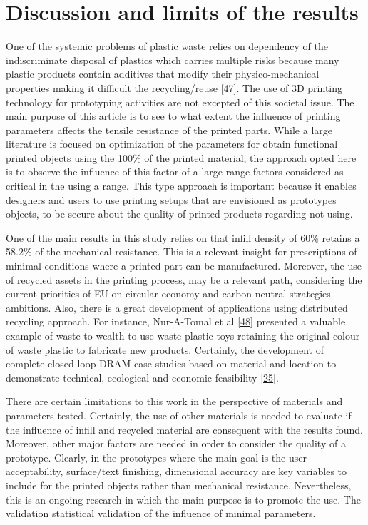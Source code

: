 \documentclass[conference,final,]{IEEEtran}
\begin{document}
\hypertarget{discussion-and-limits-of-the-results}{%
\section{Discussion and limits of the
results}\label{discussion-and-limits-of-the-results}}

One of the systemic problems of plastic waste relies on dependency of
the indiscriminate disposal of plastics which carries multiple risks
because many plastic products contain additives that modify their
physico-mechanical properties making it difficult the recycling/reuse
\protect\hyperlink{ref-Wagner2020}{{[}47{]}}. The use of 3D printing
technology for prototyping activities are not excepted of this societal
issue. The main purpose of this article is to see to what extent the
influence of printing parameters affects the tensile resistance of the
printed parts. While a large literature is focused on optimization of
the parameters for obtain functional printed objects using the 100\% of
the printed material, the approach opted here is to observe the
influence of this factor of a large range factors considered as critical
in the using a range. This type approach is important because it enables
designers and users to use printing setups that are envisioned as
prototypes objects, to be secure about the quality of printed products
regarding not using.

One of the main results in this study relies on that infill density of
60\% retains a 58.2\% of the mechanical resistance. This is a relevant
insight for prescriptions of minimal conditions where a printed part can
be manufactured. Moreover, the use of recycled assets in the printing
process, may be a relevant path, considering the current priorities of
EU on circular economy and carbon neutral strategies ambitions. Also,
there is a great development of applications using distributed recycling
approach. For instance, Nur-A-Tomal et al
\protect\hyperlink{ref-Nur-A-Tomal2020}{{[}48{]}} presented a valuable
example of waste-to-wealth to use waste plastic toys retaining the
original colour of waste plastic to fabricate new products. Certainly,
the development of complete closed loop DRAM case studies based on
material and location to demonstrate technical, ecological and economic
feasibility \protect\hyperlink{ref-CruzSanchez2020}{{[}25{]}}.

There are certain limitations to this work in the perspective of
materials and parameters tested. Certainly, the use of other materials
is needed to evaluate if the influence of infill and recycled material
are consequent with the results found. Moreover, other major factors are
needed in order to consider the quality of a prototype. Clearly, in the
prototypes where the main goal is the user acceptability, surface/text
finishing, dimensional accuracy are key variables to include for the
printed objects rather than mechanical resistance. Nevertheless, this is
an ongoing research in which the main purpose is to promote the use. The
validation statistical validation of the influence of minimal
parameters.
\end{document}
